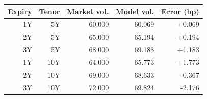 \begin{tabular}{rrrrr}
\toprule
Expiry & Tenor & Market vol. & Model vol. & Error (bp) \\
\midrule
1Y & 5Y & 60.000 & 60.069 & +0.069 \\
2Y & 5Y & 65.000 & 65.194 & +0.194 \\
3Y & 5Y & 68.000 & 69.183 & +1.183 \\
1Y & 10Y & 64.000 & 65.773 & +1.773 \\
2Y & 10Y & 69.000 & 68.633 & -0.367 \\
3Y & 10Y & 72.000 & 69.824 & -2.176 \\
\bottomrule
\end{tabular}
